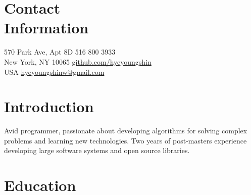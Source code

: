 \documentclass[margin,line]{resume}
\begin{document}
\newcommand{\Hawaii}{Hawai\kern.05em`\kern.05em\relax i}
\newcommand{\Manoa}{M\=anoa}

\begin{resume}

    \section{\mysidestyle Contact\\Information}
     570 Park Ave, Apt 8D            \hfill    516 800 3933\\
     New York, NY 10065             \hfill    \href{https://github.com/hyeyoungshin}{github.com/hyeyoungshin}\\
     USA  \hfill                    \hfill    \href{mailto:hyeyoungshinw@gmail.com}{hyeyoungshinw@gmail.com}

    \section{\mysidestyle Introduction}

    Avid programmer, passionate about developing algorithms for solving complex problems and learning new technologies. Two years of post-masters experience developing large software systems and open source libraries.
    
    \section{\mysidestyle Education}

    \newcommand\mysmallskip{4pt}
    \newcommand\mymedskip{10pt}
    \newcommand\mybigskip{14pt}


\end{resume}
\end{document}
